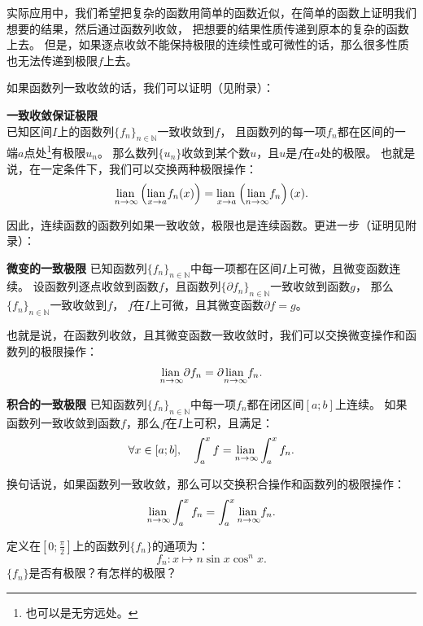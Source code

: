 \documentclass[12pt,UTF8]{ctexbook}
\begin{document}
实际应用中，我们希望把复杂的函数用简单的函数近似，在简单的函数上证明我们想要的结果，然后通过函数列收敛，
把想要的结果性质传递到原本的复杂的函数上去。
但是，如果逐点收敛不能保持极限的连续性或可微性的话，那么很多性质也无法传递到极限$f$上去。

如果函数列一致收敛的话，我们可以证明（见附录）：
\begin{tm}\textbf{一致收敛保证极限}\label{tm:2-1-10}\\
    已知区间$I$上的函数列$\{f_n\}_{n\in\mathbb{N}}$一致收敛到$f$，
    且函数列的每一项$f_n$都在区间的一端$a$点处\footnote{也可以是无穷远处。}有极限$u_n$。
    那么数列$\{u_n\}$收敛到某个数$u$，且$u$是$f$在$a$处的极限。
    也就是说，在一定条件下，我们可以交换两种极限操作：
    $$ \underset{n\to \infty}{\operatorname{lian}\,} \left( \underset{x\to a}{\operatorname{lian}\,} f_n(x) \right) = \underset{x\to a}{\operatorname{lian}\,} \left(\underset{n\to \infty}{\operatorname{lian}\,} f_n \right) (x). $$
\end{tm}

因此，连续函数的函数列如果一致收敛，极限也是连续函数。更进一步（证明见附录）：

\begin{tm}{\textbf{微变的一致极限}}\label{tm:2-1-20}
    已知函数列$\{f_n\}_{n\in\mathbb{N}}$中每一项都在区间$I$上可微，且微变函数连续。
    设函数列逐点收敛到函数$f$，且函数列$\{\partial f_n\}_{n\in\mathbb{N}}$一致收敛到函数$g$，
    那么$\{f_n\}_{n\in\mathbb{N}}$一致收敛到$f$，
    $f$在$I$上可微，且其微变函数$\partial f = g$。
\end{tm}

也就是说，在函数列收敛，且其微变函数一致收敛时，我们可以交换微变操作和函数列的极限操作：
$$ \underset{n\to \infty}{\operatorname{lian}\,} \partial f_n = \partial \underset{n\to \infty}{\operatorname{lian}\,} f_n. $$

\begin{tm}{\textbf{积合的一致极限}}\label{tm:2-1-30}
    已知函数列$\{f_n\}_{n\in\mathbb{N}}$中每一项$f_n$都在闭区间$[a;b]$上连续。
    如果函数列一致收敛到函数$f$，那么$f$在$I$上可积，且满足：
    $$ \forall x \in [a; b],\quad \int_{a}^x f = \underset{n\to \infty}{\operatorname{lian}\,} \int_{a}^x f_n. $$
\end{tm}

换句话说，如果函数列一致收敛，那么可以交换积合操作和函数列的极限操作：
$$ \underset{n\to \infty}{\operatorname{lian}\,} \int_{a}^x f_n = \int_{a}^x \underset{n\to \infty}{\operatorname{lian}\,} f_n. $$

\begin{et}
    定义在$\left[0;\frac{\pi}{2}\right]$上的函数列$\{f_n\}$的通项为：
    $$ f_n: x\mapsto n\sin{x}\cos^n{x}. $$
    $\{f_n\}$是否有极限？有怎样的极限？
\end{et}
\end{document}
